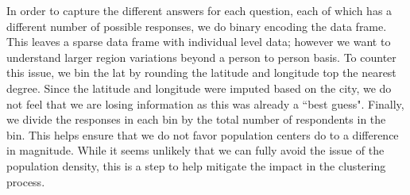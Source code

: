 \documentclass[10pt,letterpaper]{article}
\begin{document}

In order to capture the different answers for each question, each of which has a different number of possible responses, we do binary encoding the data frame. This leaves a sparse data frame with individual level data; however we want to understand larger region variations beyond a person to person basis. To counter this issue, we bin the lat by rounding the latitude and longitude top the nearest degree. Since the latitude and longitude were imputed based on the city, we do not feel that we are losing information as this was already a ``best guess". Finally, we divide the responses in each bin by the total number of respondents in the bin. This helps ensure that we do not favor population centers do to a difference in magnitude. While it seems unlikely that we can fully avoid the issue of the population density, this is a step to help mitigate the impact in the clustering process.
\end{document}
